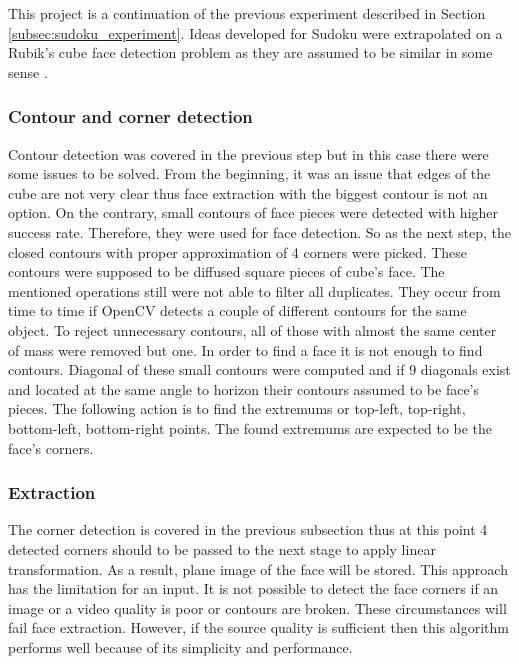 \documentclass[../../main]{subfiles}
\begin{document}
This project is a continuation of the previous experiment described in Section \ref{subsec:sudoku_experiment}. Ideas developed for Sudoku were extrapolated on a Rubik's cube face detection problem as they are assumed to be similar in some sense \cite{rubiks_cube_zakharov}.

\subsubsection{Contour and corner detection}

Contour detection was covered in the previous step but in this case there were some issues to be solved. From the beginning, it was an issue that edges of the cube are not very clear thus face extraction with the biggest contour is not an option. On the contrary, small contours of face pieces were detected with higher success rate. Therefore, they were used for face detection. So as the next step, the closed contours with proper approximation of 4 corners were picked. These contours were supposed to be diffused square pieces of cube's face. The mentioned operations still were not able to filter all duplicates. They occur from time to time if \ac{OpenCV} detects a couple of different contours for the same object. To reject unnecessary contours, all of those with almost the same center of mass were removed but one. In order to find a face it is not enough to find contours. Diagonal of these small contours were computed and if 9 diagonals exist and located at the same angle to horizon their contours assumed to be face's pieces. The following action is to find the extremums or top-left, top-right, bottom-left, bottom-right points. The found extremums are expected to be the face's corners.

\subsubsection{Extraction}

The corner detection is covered in the previous subsection thus at this point 4 detected corners should to be passed to the next stage to apply linear transformation. As a result, plane image of the face will be stored.
This approach has the limitation for an input. It is not possible to detect the face corners if an image or a video quality is poor or contours are broken. These circumstances will fail face extraction. However, if the source quality is sufficient then this algorithm performs well because of its simplicity and performance.
\end{document}
